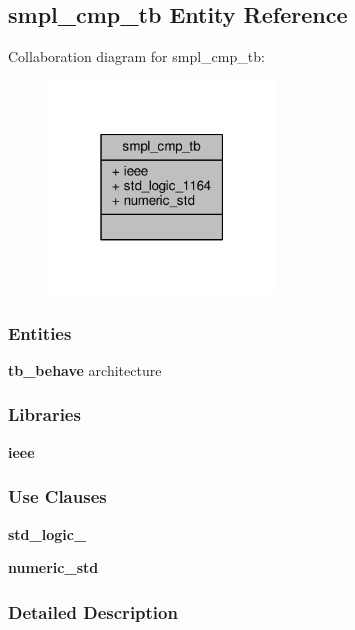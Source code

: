 \subsection{smpl\+\_\+cmp\+\_\+tb Entity Reference}
\label{classsmpl__cmp__tb}


Collaboration diagram for smpl\+\_\+cmp\+\_\+tb\+:\nopagebreak
\begin{figure}[H]
\begin{center}
\leavevmode
\includegraphics[width=171pt]{da/d20/classsmpl__cmp__tb__coll__graph}
\end{center}
\end{figure}
\subsubsection*{Entities}
\begin{DoxyCompactItemize}
\item 
{\bf tb\+\_\+behave} architecture
\end{DoxyCompactItemize}
\subsubsection*{Libraries}
 \begin{DoxyCompactItemize}
\item 
{\bf ieee} 
\end{DoxyCompactItemize}
\subsubsection*{Use Clauses}
 \begin{DoxyCompactItemize}
\item 
{\bf std\+\_\+logic\+\_}   
\item 
{\bf numeric\+\_\+std}   
\end{DoxyCompactItemize}


\subsubsection{Detailed Description}


